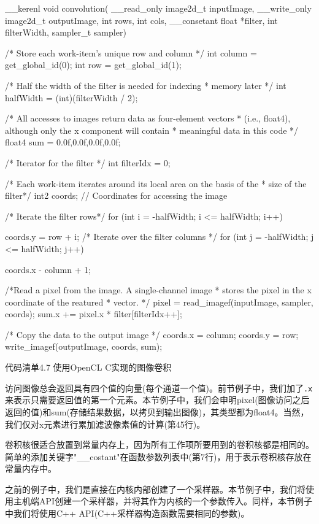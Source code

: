 \begin{codebox}[cpp]
__kerenl
void convolution(
  __read_only image2d_t inputImage,
  __write_only image2d_t outputImage,
  int rows,
  int cols,
  __consetant float *filter,
  int filterWidth,
  sampler_t sampler)
{
  /* Store each work-item's unique row and column */
  int column = get_global_id(0);
  int row = get_global_id(1);

  /* Half the width of the filter is needed for indexing
   * memory later */
  int halfWidth = (int)(filterWidth / 2);

  /* All accesses to images return data as four-element vectors
   * (i.e., float4), although only the x component will contain
   * meaningful data in this code */
  float4 sum = {0.0f,0.0f,0.0f,0.0f};

  /* Iterator for the filter */
  int filterIdx = 0;

  /* Each work-item iterates around its local area on the basis of the
   * size of the filter*/
  int2 coords; // Coordinates for accessing the image

  /* Iterate the filter rows*/
  for (int i = -halfWidth; i <= halfWidth; i++)
  {
    coords.y = row + i;
    /* Iterate over the filter columns */
    for (int j = -halfWidth; j <= halfWidth; j++)
    {
      coords.x - column + 1;

      /*Read a pixel from the image. A single-channel image
       * stores the pixel in the x coordinate of the reatured
       * vector. */
      pixel = read_imagef(inputImage, sampler, coords);
      sum.x += pixel.x * filter[filterIdx++];

    }
  }

  /* Copy the data to the output image */
  coords.x = column;
  coords.y = row;
  write_imagef(outputImage, coords, sum);
}
\end{codebox}

代码清单4.7 使用OpenCL C实现的图像卷积

访问图像总会返回具有四个值的向量(每个通道一个值)。前节例子中，我们加了\texttt{.x}来表示只需要返回值的第一个元素。本节例子中，我们会申明pixel(图像访问之后返回的值)和sum(存储结果数据，以拷贝到输出图像)，其类型都为float4。当然，我们仅对x元素进行累加滤波像素值的计算(第45行)。

卷积核很适合放置到常量内存上，因为所有工作项所要用到的卷积核都是相同的。简单的添加关键字"\_\allowbreak{}\_\allowbreak{}costant"在函数参数列表中(第7行)，用于表示卷积核存放在常量内存中。

之前的例子中，我们是直接在内核内部创建了一个采样器。本节例子中，我们将使用主机端API创建一个采样器，并将其作为内核的一个参数传入。同样，本节例子中我们将使用C++ API(C++采样器构造函数需要相同的参数)。

